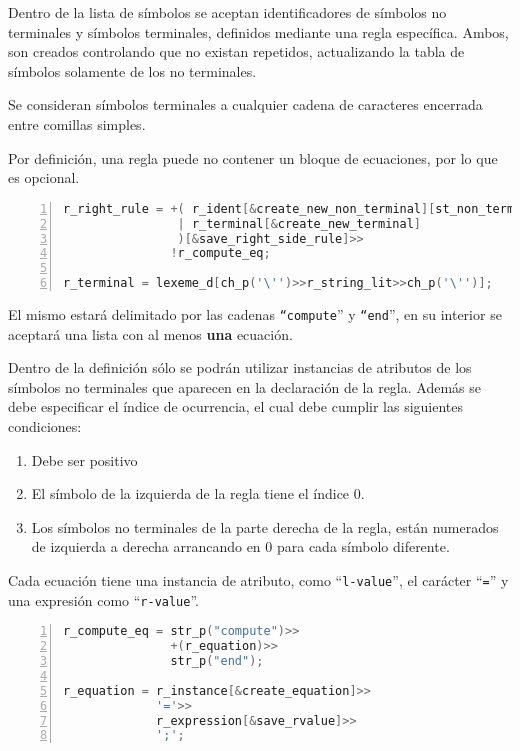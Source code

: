 Dentro de la lista de símbolos se aceptan identificadores de símbolos no terminales y símbolos terminales, definidos mediante una regla específica. Ambos, son creados controlando que no existan repetidos, actualizando la tabla de símbolos solamente de los no terminales.

Se consideran símbolos terminales a cualquier cadena de caracteres encerrada entre comillas simples.

Por definición, una regla puede no contener un bloque de ecuaciones, por lo que es opcional.

\begin{lstlisting}[language=C++, basicstyle=\scriptsize, numbers=left, numbersep=5pt, numberstyle=\tiny]
r_right_rule = +( r_ident[&create_new_non_terminal][st_non_terminal.add]
                | r_terminal[&create_new_terminal]
                )[&save_right_side_rule]>>
               !r_compute_eq;

r_terminal = lexeme_d[ch_p('\'')>>r_string_lit>>ch_p('\'')];
\end{lstlisting}

El mismo estará delimitado por las cadenas \texttt{``compute}'' y \texttt{``end}'', en su interior se aceptará una lista con al menos \textbf{una} ecuación.

Dentro de la definición sólo se podrán utilizar instancias de atributos de los símbolos no terminales que aparecen en la declaración de la regla. Además se debe especificar el índice de ocurrencia, el cual debe cumplir las siguientes condiciones:

\begin{enumerate}
\item Debe ser positivo
\item El símbolo de la izquierda de la regla tiene el índice 0.
\item Los símbolos no terminales de la parte derecha de la regla, están numerados de izquierda a derecha arrancando en 0 para cada símbolo diferente.
\end{enumerate}

Cada ecuación tiene una instancia de atributo, como ``\texttt{l-value}'', el carácter ``\texttt{=}'' y una expresión como ``\texttt{r-value}''.

\begin{lstlisting}[language=C++, basicstyle=\scriptsize, numbers=left, numbersep=5pt, numberstyle=\tiny]
r_compute_eq = str_p("compute")>>
               +(r_equation)>>
               str_p("end");

r_equation = r_instance[&create_equation]>>
             '='>>
             r_expression[&save_rvalue]>>
             ';';
\end{lstlisting}

